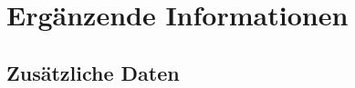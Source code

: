 \chapter{Ergänzende Informationen}
\label{app:informationen}

\section{Zusätzliche Daten}
\lipsum[3]
